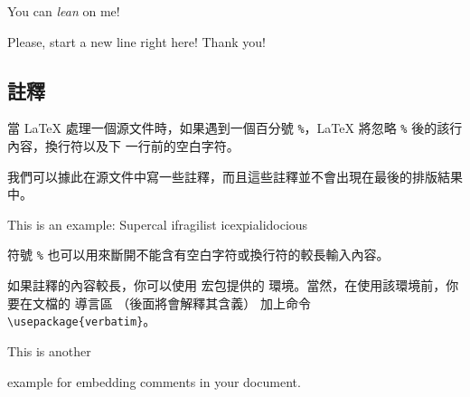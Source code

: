 \begin{example}
You can \textsl{lean} on me!
\end{example}
\begin{example}
Please, start a new line
right here!\newline
Thank you!
\end{example}

\subsection{註釋}


當 \LaTeX{} 處理一個源文件時，如果遇到一個百分號 \verb|%|，\LaTeX{} 將忽略 \verb|%| 後的該行內容，換行符以及下
一行前的空白字符。


我們可以據此在源文件中寫一些註釋，而且這些註釋並不會出現在最後的排版結果中。

\begin{example}
This is an %
example: Supercal%
              ifragilist%
    icexpialidocious
\end{example}


符號 \texttt{\%} 也可以用來斷開不能含有空白字符或換行符的較長輸入內容。


如果註釋的內容較長，你可以使用  宏包提供的  環境。當然，在使用該環境前，你要在文檔的
導言區 （後面將會解釋其含義） 加上命令 \verb|\usepackage{verbatim}|。
\begin{example}
This is another
\begin{comment}
rather stupid,
but helpful
\end{comment}
example for embedding
comments in your document.
\end{example}

